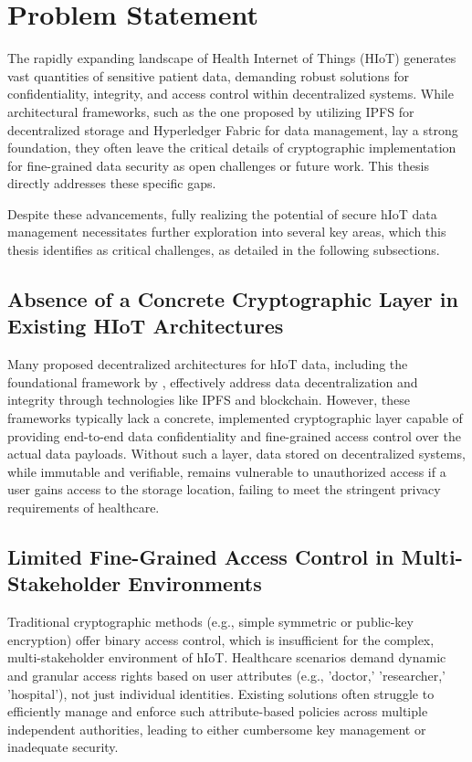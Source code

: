 \documentclass[cic,tc,english]{iiufrgs}
\begin{document}
    \section{Problem Statement}
        \label{sec:problemstatement}

        The rapidly expanding landscape of Health Internet of Things (HIoT) generates vast quantities of sensitive patient data, demanding robust solutions for confidentiality, integrity, and access control within decentralized systems. While architectural frameworks, such as the one proposed by \citet{laura2023} utilizing IPFS for decentralized storage and Hyperledger Fabric for data management, lay a strong foundation, they often leave the critical details of cryptographic implementation for fine-grained data security as open challenges or future work. This thesis directly addresses these specific gaps.

        Despite these advancements, fully realizing the potential of secure hIoT data management necessitates further exploration into several key areas, which this thesis identifies as critical challenges, as detailed in the following subsections.

        \subsection{Absence of a Concrete Cryptographic Layer in Existing HIoT Architectures}
            Many proposed decentralized architectures for hIoT data, including the foundational framework by \citet{laura2023}, effectively address data decentralization and integrity through technologies like IPFS and blockchain. However, these frameworks typically lack a concrete, implemented cryptographic layer capable of providing end-to-end data confidentiality and fine-grained access control over the actual data payloads. Without such a layer, data stored on decentralized systems, while immutable and verifiable, remains vulnerable to unauthorized access if a user gains access to the storage location, failing to meet the stringent privacy requirements of healthcare.

        \subsection{Limited Fine-Grained Access Control in Multi-Stakeholder Environments}
            Traditional cryptographic methods (e.g., simple symmetric or public-key encryption) offer binary access control, which is insufficient for the complex, multi-stakeholder environment of hIoT. Healthcare scenarios demand dynamic and granular access rights based on user attributes (e.g., 'doctor,' 'researcher,' 'hospital'), not just individual identities. Existing solutions often struggle to efficiently manage and enforce such attribute-based policies across multiple independent authorities, leading to either cumbersome key management or inadequate security.
\end{document}
